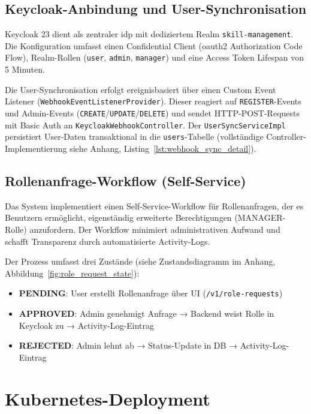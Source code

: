 \subsection{Keycloak-Anbindung und User-Synchronisation}

Keycloak 23\cite{keycloak_docs} dient als zentraler \gls{idp} mit dediziertem Realm \texttt{skill-management}. Die Konfiguration umfasst einen Confidential Client (\gls{oauth}2 Authorization Code Flow), Realm-Rollen (\texttt{user}, \texttt{admin}, \texttt{manager}) und eine Access Token Lifespan von 5 Minuten.

Die User-Synchronisation erfolgt ereignisbasiert über einen Custom Event Listener (\texttt{WebhookEventListenerProvider}). Dieser reagiert auf \texttt{REGISTER}-Events und Admin-Events (\texttt{CREATE}/\texttt{UPDATE}/\texttt{DELETE}) und sendet HTTP-POST-Requests mit Basic Auth an \newline\texttt{KeycloakWebhookController}. Der \texttt{UserSyncServiceImpl} persistiert User-Daten transaktional in die \texttt{users}-Tabelle (vollständige Controller-Implementierung siehe Anhang, Listing~\ref{lst:webhook_sync_detail}).

\subsection{Rollenanfrage-Workflow (Self-Service)}

Das System implementiert einen Self-Service-Workflow für Rollenanfragen, der es Benutzern ermöglicht, eigenständig erweiterte Berechtigungen (MANAGER-Rolle) anzufordern. Der Workflow minimiert administrativen Aufwand und schafft Transparenz durch automatisierte Activity-Logs.

Der Prozess umfasst drei Zustände (siehe Zustandsdiagramm im Anhang, Abbildung~\ref{fig:role_request_state}):
\begin{itemize}[noitemsep]
    \item \textbf{PENDING}: User erstellt Rollenanfrage über UI (\texttt{/v1/role-requests})
    \item \textbf{APPROVED}: Admin genehmigt Anfrage → Backend weist Rolle in Keycloak zu → Activity-Log-Eintrag
    \item \textbf{REJECTED}: Admin lehnt ab → Status-Update in DB → Activity-Log-Eintrag
\end{itemize}

\section{Kubernetes-Deployment}
\label{sec:kubernetes_deployment}

